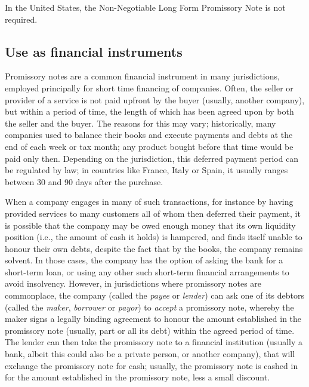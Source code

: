 In the United States, the Non-Negotiable Long Form Promissory Note is not required.




\subsection{Use as financial instruments}
\label{sss:usea-9570}




Promissory notes are a common financial instrument in many jurisdictions, employed
principally for short time financing of companies. Often, the seller or provider of a
service is not paid upfront by the buyer (usually, another company), but within a period
of time, the length of which has been agreed upon by both the seller and the buyer. The
reasons for this may vary; historically, many companies used to balance their books and
execute payments and debts at the end of each week or tax month; any product bought before
that time would be paid only then. Depending on the jurisdiction, this deferred payment
period can be regulated by law; in countries like France, Italy or Spain, it usually
ranges between 30 and 90 days after the purchase.



When a company engages in many of such transactions, for instance by having provided
services to many customers all of whom then deferred their payment, it is possible that
the company may be owed enough money that its own liquidity position (i.e., the amount of
cash it holds) is hampered, and finds itself unable to honour their own debts, despite the
fact that by the books, the company remains solvent. In those cases, the company has the
option of asking the bank for a short-term loan, or using any other such short-term
financial arrangements to avoid insolvency. However, in jurisdictions where promissory
notes are commonplace, the company (called the \textit{payee} or \textit{lender}) can ask
one of its debtors (called the \textit{maker}, \textit{borrower} or \textit{payor}) to
\textit{accept} a promissory note, whereby the maker signs a legally binding agreement to
honour the amount established in the promissory note (usually, part or all its debt)
within the agreed period of time. The lender can then take the promissory note to a
financial institution (usually a bank, albeit this could also be a private person, or
another company), that will exchange the promissory note for cash; usually, the promissory
note is cashed in for the amount established in the promissory note, less a small
discount.



